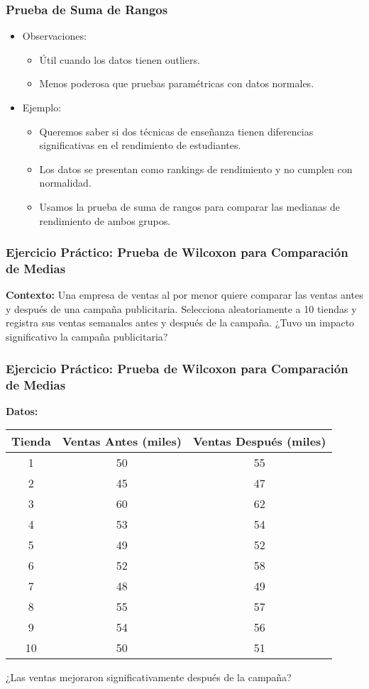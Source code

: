 \documentclass[aspectratio=169]{beamer}
\begin{document}
\begin{frame}
\frametitle{Prueba de Suma de Rangos}
\begin{itemize}
\item Observaciones:
  \begin{itemize}
  \item Útil cuando los datos tienen outliers.
  \item Menos poderosa que pruebas paramétricas con datos normales.
  \end{itemize}
\item Ejemplo:
  \begin{itemize}
  \item Queremos saber si dos técnicas de enseñanza tienen diferencias significativas en el rendimiento de estudiantes.
  \item Los datos se presentan como rankings de rendimiento y no cumplen con normalidad.
  \item Usamos la prueba de suma de rangos para comparar las medianas de rendimiento de ambos grupos.
  \end{itemize}
\end{itemize}
\end{frame}


\begin{frame}
\frametitle{Ejercicio Práctico: Prueba de Wilcoxon para Comparación de Medias}
\textbf{Contexto:} 
Una empresa de ventas al por menor quiere comparar las ventas antes y después de una campaña publicitaria. Selecciona aleatoriamente a 10 tiendas y registra sus ventas semanales antes y después de la campaña. ¿Tuvo un impacto significativo la campaña publicitaria?

\end{frame}


\begin{frame}
\frametitle{Ejercicio Práctico: Prueba de Wilcoxon para Comparación de Medias}
\textbf{Datos:}
\begin{table}
\begin{tabular}{|c|c|c|}
\hline
Tienda & Ventas Antes (miles) & Ventas Después (miles) \\
\hline
1 & 50 & 55 \\
2 & 45 & 47 \\
3 & 60 & 62 \\
4 & 53 & 54 \\
5 & 49 & 52 \\
6 & 52 & 58 \\
7 & 48 & 49 \\
8 & 55 & 57 \\
9 & 54 & 56 \\
10 & 50 & 51 \\
\hline
\end{tabular}
\end{table}
¿Las ventas mejoraron significativamente después de la campaña?
\end{frame}
\end{document}
